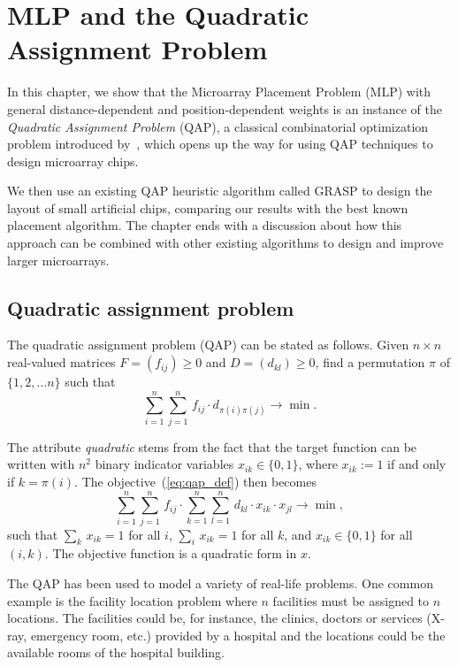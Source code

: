 \chapter{MLP and the Quadratic Assignment Problem}
\label{ch:qap}

In this chapter, we show that the Microarray Placement Problem (MLP) with
general distance-dependent and position-dependent weights is an instance of the
\emph{Quadratic Assignment Problem} (QAP), a classical combinatorial
optimization problem introduced by~\citet{Koopmans1957}, which opens up the way
for using QAP techniques to design microarray chips.

We then use an existing QAP heuristic algorithm called GRASP to design the
layout of small artificial chips, comparing our results with the best known
placement algorithm. The chapter ends with a discussion about how this approach
can be combined with other existing algorithms to design and improve larger
microarrays.

\section{Quadratic assignment problem}
\label{sec:qap_qap}

The quadratic assignment problem (QAP) can be stated as follows. Given
$n \times n$ real-valued matrices $F = (f_{ij})\geq 0$ and $D = (d_{kl})\geq 0$,
find a permutation $\pi$ of $\{1, 2, \ldots n\}$ such that
\begin{equation}\label{eq:qap_def}
  \sum_{i=1}^{n} \sum_{j=1}^{n}\,  f_{ij} \cdot d_{\pi(i)\pi(j)} \to \min.
\end{equation}

The attribute \emph{quadratic} stems from the fact that the target function can
be written with $n^2$ binary indicator variables $x_{ik}\in\{0,1\}$, where
$x_{ik}:=1$ if and only if $k=\pi(i)$. The objective~(\ref{eq:qap_def}) then
becomes
\[
  \sum_{i=1}^{n} \sum_{j=1}^{n}\,  f_{ij} \cdot 
  \sum_{k=1}^{n} \sum_{l=1}^{n}\,  d_{kl} \cdot x_{ik}\cdot x_{jl}
  \to \min,
\]
such that $\sum_{k}\, x_{ik}=1$ for all $i$, $\sum_{i}\, x_{ik}=1$ for all $k$,
and $x_{ik}\in\{0,1\}$ for all $(i,k)$. The objective function is a quadratic
form in $x$.

The QAP has been used to model a variety of real-life problems. One common
example is the facility location problem where $n$ facilities must be assigned
to $n$ locations. The facilities could be, for instance, the clinics, doctors or
services (X-ray, emergency room, etc.) provided by a hospital and the locations
could be the available rooms of the hospital building.

